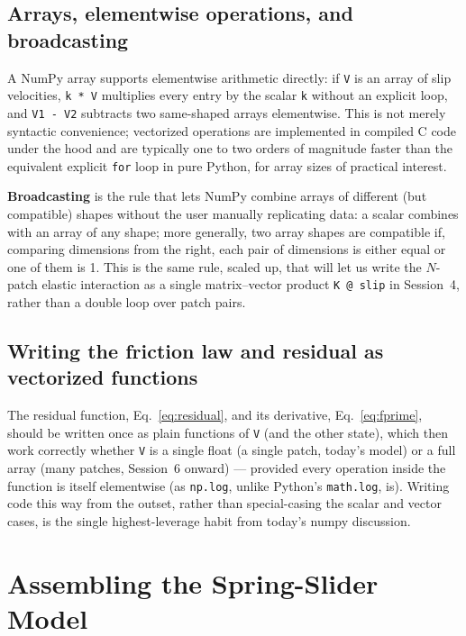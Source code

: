 \subsection{Arrays, elementwise operations, and broadcasting}

A NumPy array supports elementwise arithmetic directly: if \texttt{V} is an array of slip velocities, \texttt{k * V} multiplies every entry by the scalar \texttt{k} without an explicit loop, and \texttt{V1 - V2} subtracts two same-shaped arrays elementwise. This is not merely syntactic convenience; vectorized operations are implemented in compiled C code under the hood and are typically one to two orders of magnitude faster than the equivalent explicit \texttt{for} loop in pure Python, for array sizes of practical interest.

\textbf{Broadcasting} is the rule that lets NumPy combine arrays of different (but compatible) shapes without the user manually replicating data: a scalar combines with an array of any shape; more generally, two array shapes are compatible if, comparing dimensions from the right, each pair of dimensions is either equal or one of them is 1. This is the same rule, scaled up, that will let us write the $N$-patch elastic interaction as a single matrix–vector product \texttt{K @ slip} in Session~4, rather than a double loop over patch pairs.

\subsection{Writing the friction law and residual as vectorized functions}

The residual function, Eq.~\eqref{eq:residual}, and its derivative, Eq.~\eqref{eq:fprime}, should be written once as plain functions of \texttt{V} (and the other state), which then work correctly whether \texttt{V} is a single float (a single patch, today's model) or a full array (many patches, Session~6 onward) --- provided every operation inside the function is itself elementwise (as \texttt{np.log}, unlike Python's \texttt{math.log}, is). Writing code this way from the outset, rather than special-casing the scalar and vector cases, is the single highest-leverage habit from today's numpy discussion.

\section{Assembling the Spring-Slider Model}

